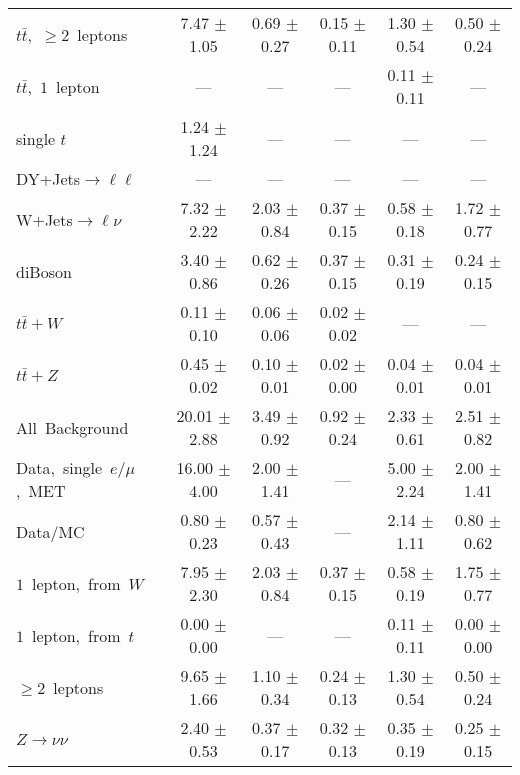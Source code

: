 \documentclass{article}
\begin{document}
\begin{longtable}{|l|c|c|c|c|c|}
$t\bar{t}$,~$\ge2$~leptons & 7.47 $\pm$ 1.05  & 0.69 $\pm$ 0.27  & 0.15 $\pm$ 0.11  & 1.30 $\pm$ 0.54  & 0.50 $\pm$ 0.24 \\* 
$t\bar{t}$,~$1$~lepton & ---  & ---  & ---  & 0.11 $\pm$ 0.11  & --- \\* 
single $t$  & 1.24 $\pm$ 1.24  & ---  & ---  & ---  & --- \\* 
DY+Jets$\rightarrow\ell\ell$  & ---  & ---  & ---  & ---  & --- \\* 
W+Jets$\rightarrow\ell\nu$  & 7.32 $\pm$ 2.22  & 2.03 $\pm$ 0.84  & 0.37 $\pm$ 0.15  & 0.58 $\pm$ 0.18  & 1.72 $\pm$ 0.77 \\* 
diBoson  & 3.40 $\pm$ 0.86  & 0.62 $\pm$ 0.26  & 0.37 $\pm$ 0.15  & 0.31 $\pm$ 0.19  & 0.24 $\pm$ 0.15 \\* 
$t\bar{t}+W$  & 0.11 $\pm$ 0.10  & 0.06 $\pm$ 0.06  & 0.02 $\pm$ 0.02  & ---  & --- \\* 
$t\bar{t}+Z$  & 0.45 $\pm$ 0.02  & 0.10 $\pm$ 0.01  & 0.02 $\pm$ 0.00  & 0.04 $\pm$ 0.01  & 0.04 $\pm$ 0.01 \\* 
\hline \hline 
All~Background  & 20.01 $\pm$ 2.88  & 3.49 $\pm$ 0.92  & 0.92 $\pm$ 0.24  & 2.33 $\pm$ 0.61  & 2.51 $\pm$ 0.82 \\* 
Data,~single~$e/\mu$,~MET  & 16.00 $\pm$ 4.00  & 2.00 $\pm$ 1.41  & ---  & 5.00 $\pm$ 2.24  & 2.00 $\pm$ 1.41 \\* 
Data/MC  & 0.80 $\pm$ 0.23  & 0.57 $\pm$ 0.43  & ---  & 2.14 $\pm$ 1.11  & 0.80 $\pm$ 0.62 \\* 
\hline \hline 
$1$~lepton,~from~$W$  & 7.95 $\pm$ 2.30  & 2.03 $\pm$ 0.84  & 0.37 $\pm$ 0.15  & 0.58 $\pm$ 0.19  & 1.75 $\pm$ 0.77 \\* 
$1$~lepton,~from~$t$  & 0.00 $\pm$ 0.00  & ---  & ---  & 0.11 $\pm$ 0.11  & 0.00 $\pm$ 0.00 \\* 
$\ge2$~leptons  & 9.65 $\pm$ 1.66  & 1.10 $\pm$ 0.34  & 0.24 $\pm$ 0.13  & 1.30 $\pm$ 0.54  & 0.50 $\pm$ 0.24 \\* 
$Z\rightarrow\nu\nu$  & 2.40 $\pm$ 0.53  & 0.37 $\pm$ 0.17  & 0.32 $\pm$ 0.13  & 0.35 $\pm$ 0.19  & 0.25 $\pm$ 0.15 \\* 
\hline 
\end{longtable} 

 
 
 
 
\pagebreak 

 
 
 
 
\end{document}
